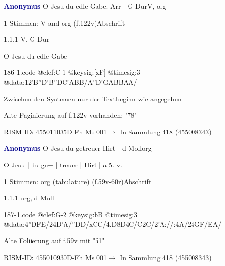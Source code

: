\documentclass[twocolumn]{book}
\begin{document}
\par \vspace{7pt} \textcolor{darkblue}{\textbf{Anonymus  }}\hfillplus{\textbf{[186]}}\newline O Jesu du edle Gabe. Arr - G-Dur\newline V, org
\par \begin{itshape}\end{itshape} 
\par \textcolor{darkblue}{}  1 Stimmen: V and org  (f.122v)\newline Abschrift
\par 1.1.1  V, G-Dur\newline \begin{footnotesize} O Jesu du edle Gabe \end{footnotesize}  
\begin{filecontents*}{186-1.code}
@clef:C-1
@keysig:[xF]
@timesig:3
@data:12'B''D'B''DC'ABB/A''D'GABBAA/
\end{filecontents*}
\newline
%
\par Zwischen den Systemen nur der Textbeginn wie angegeben
\par Alte Paginierung auf f.122v vorhanden: "78"
\par RISM-ID: 455011035\newline D-Fh  Ms 001\newline $\rightarrow$ In Sammlung 418 (455008343)
      
\par \vspace{7pt} \textcolor{darkblue}{\textbf{Anonymus  }}\hfillplus{\textbf{[187]}}\newline O Jesu du getreuer Hirt - d-Moll\newline org
\par \begin{itshape}[f.59v, at left:] O Jesu | du ge= | treuer | Hirt | a 5. v.\end{itshape} 
\par \textcolor{darkblue}{}  1 Stimmen: org (tabulature)  (f.59v-60r)\newline Abschrift
\par 1.1.1  org, d-Moll  
\begin{filecontents*}{187-1.code}
@clef:G-2
@keysig:bB
@timesig:3
@data:4''DFE/24D'A/''DD/xCC/4.D8D4C/C2C/2'A://:4A/24GF/EA/
\end{filecontents*}
\newline
%
\par Alte Foliierung auf f.59v mit "51"
\par RISM-ID: 455010930\newline D-Fh  Ms 001\newline $\rightarrow$ In Sammlung 418 (455008343)
      
\end{document}
